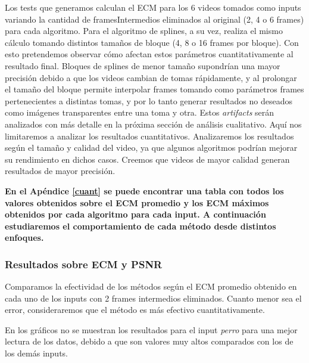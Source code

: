 \par Los tests que generamos calculan el ECM para los 6 videos tomados como inputs variando la cantidad de framesIntermedios eliminados al original (2, 4 o 6 frames) para cada algoritmo. Para el algoritmo de splines, a su vez, realiza el mismo cálculo tomando distintos tamaños de bloque (4, 8 o 16 frames por bloque). Con esto pretendemos observar cómo afectan estos parámetros cuantitativamente al resultado final. Bloques de splines de menor tamaño supondrían una mayor precisión debido a que los videos cambian de tomas rápidamente, y al prolongar el tamaño del bloque permite interpolar frames tomando como parámetros frames pertenecientes a distintas tomas, y por lo tanto generar resultados no deseados como imágenes transparentes entre una toma y otra. Estos \textit{artifacts} serán analizados con más detalle en la próxima sección de análisis cualitativo. Aquí nos limitaremos a analizar los resultados cuantitativos. Analizaremos los resultados según el tamaño y calidad del video, ya que algunos algoritmos podrían mejorar su rendimiento en dichos casos. Creemos que videos de mayor calidad generan resultados de mayor precisión.


\newpage
\par  \textbf{En el Apéndice \ref{cuant} se puede encontrar una tabla con todos los valores obtenidos sobre el ECM promedio y los ECM máximos obtenidos por cada algoritmo para cada input. A continuación estudiaremos el comportamiento de cada método desde distintos enfoques.}

\subsubsection{Resultados sobre ECM y PSNR}


\par Comparamos la efectividad de los métodos según el ECM promedio obtenido en cada uno de los inputs con 2 frames intermedios eliminados. Cuanto menor sea el error, consideraremos que el método es más efectivo cuantitativamente. 
\par En los gráficos no se muestran los resultados para el input \textit{perro} para una mejor lectura de los datos, debido a que son valores muy altos comparados con los de los demás inputs. 

